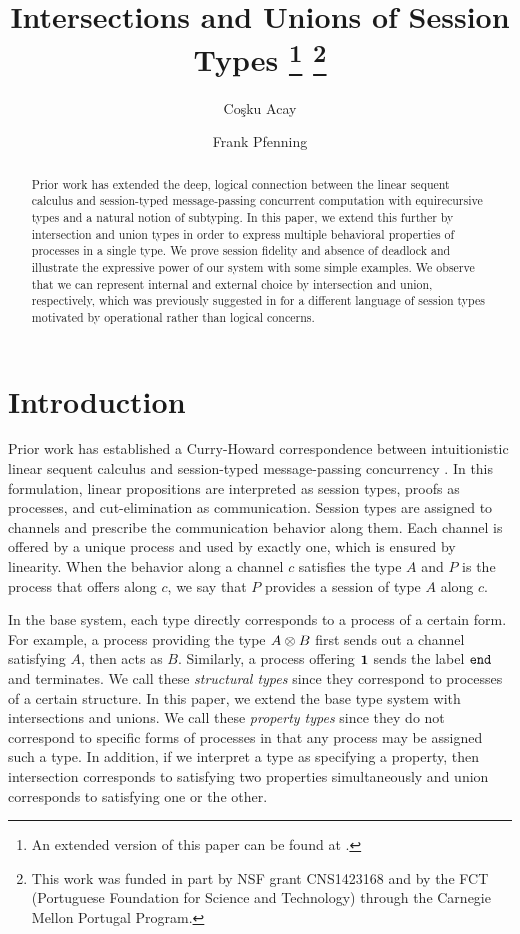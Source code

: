 \documentclass[submission,copyright,creativecommons]{eptcs}
\title{Intersections and Unions of Session Types%
\footnote{An extended version of this paper can be found at \cite{Acay16}.}%
\footnote{This work was funded in part by NSF grant CNS1423168 and by the FCT (Portuguese Foundation for Science and Technology) through the Carnegie Mellon Portugal Program.}%
}
\author{Co\c{s}ku Acay
\institute{Carnegie Mellon University\\
Pennsylvania, USA}
\email{cacay@cmu.edu}
\and
Frank Pfenning
\institute{Carnegie Mellon University \\
Pennsylvania, USA}
\email{fp@cs.cmu.edu}
}
\begin{document}
\maketitle

\begin{abstract}
  Prior work has extended the deep, logical connection between the linear sequent calculus and session-typed message-passing concurrent computation with equirecursive types and a natural notion of subtyping. In this paper, we extend this further by intersection and union types in order to express multiple behavioral properties of processes in a single type. We prove session fidelity and absence of deadlock and illustrate the expressive power of our system with some simple examples. We observe that we can represent internal and external choice by intersection and union, respectively, which was previously suggested in \cite{CastagnaDGP09,Padovani10} for a different language of session types motivated by operational rather than logical concerns.
\end{abstract}


\section{Introduction}

Prior work has established a Curry-Howard correspondence between intuitionistic linear sequent calculus and session-typed message-passing concurrency \cite{CairesP10, PfenningG15, Honda93}. In this formulation, linear propositions are interpreted as session types, proofs as processes, and cut-elimination as communication. Session types are assigned to channels and prescribe the communication behavior along them. Each channel is offered by a unique process and used by exactly one, which is ensured by linearity. When the behavior along a channel $c$ satisfies the type $A$ and $P$ is the process that offers along $c$, we say that $P$ provides a session of type $A$ along $c$.

In the base system, each type directly corresponds to a process of a certain form. For example, a process providing the type $A \otimes B$ first sends out a channel satisfying $A$, then acts as $B$. Similarly, a process offering $\mathbf{1}$ sends the label $\texttt{end}$ and terminates. We call these \emph{structural types} since they correspond to processes of a certain structure. In this paper, we extend the base type system with intersections and unions. We call these \emph{property types} since they do not correspond to specific forms of processes in that any process may be assigned such a type. In addition, if we interpret a type as specifying a property, then intersection corresponds to satisfying two properties simultaneously and union corresponds to satisfying one or the other.
\end{document}
